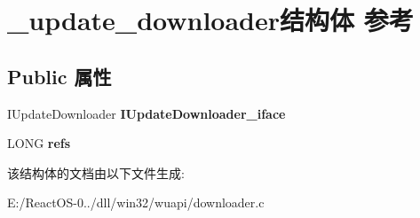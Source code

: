 \hypertarget{struct__update__downloader}{}\section{\+\_\+update\+\_\+downloader结构体 参考}
\label{struct__update__downloader}
\subsection*{Public 属性}
\begin{DoxyCompactItemize}
\item 
\mbox{\label{struct__update__downloader_a4d8d97479fc44a9ece6a966329f4fea1}} 
I\+Update\+Downloader {\bfseries I\+Update\+Downloader\+\_\+iface}
\item 
\mbox{\label{struct__update__downloader_a0174132e82cf14d27cbdc4b557581a42}} 
L\+O\+NG {\bfseries refs}
\end{DoxyCompactItemize}


该结构体的文档由以下文件生成\+:\begin{DoxyCompactItemize}
\item 
E\+:/\+React\+O\+S-\/0../dll/win32/wuapi/downloader.\+c\end{DoxyCompactItemize}
